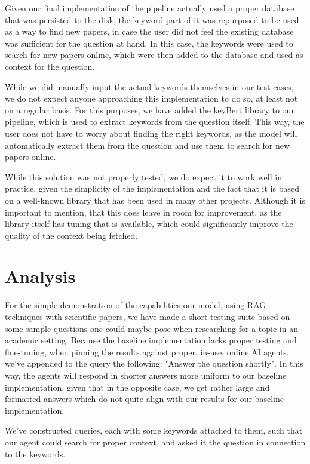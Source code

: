 \documentclass[fleqn,moreauthors,10pt]{ds_report}
\begin{document}
Given our final implementation of the pipeline actually used a proper database that was persisted to the disk, the keyword part of it was repurposed to be used as a way to find new papers, in case the user did not feel the existing database was sufficient for the question at hand. In this case, the keywords were used to search for new papers online, which were then added to the database and used as context for the question.

While we did manually input the actual keywords themselves in our test cases, we do not expect anyone approaching this implementation to do so, at least not on a regular basis. For this purposes, we have added the keyBert \cite{grootendorst2020keybert} library to our pipeline, which is used to extract keywords from the question itself. This way, the user does not have to worry about finding the right keywords, as the model will automatically extract them from the question and use them to search for new papers online.

While this solution was not properly tested, we do expect it to work well in practice, given the simplicity of the implementation and the fact that it is based on a well-known library that has been used in many other projects. Although it is important to mention, that this does leave in room for improvement, as the library itself has tuning that is available, which could significantly improve the quality of the context being fetched.

\section*{Analysis}
For the simple demonstration of the capabilities our model, using RAG techniques with scientific papers, we have made a short testing suite based on some sample questions one could maybe pose when researching for a topic in an academic setting. Because the baseline implementation lacks proper testing and fine-tuning, when pinning the results against proper, in-use, online AI agents, we've appended to the query the following: "Answer the question shortly". In this way, the agents will respond in shorter answers more uniform to our baseline implementation, given that in the opposite case, we get rather large and formatted answers which do not quite align with our results for our baseline implementation.

We've constructed queries, each with some keywords attached to them, such that our agent could search for proper context, and asked it the question in connection to the keywords.
\end{document}

